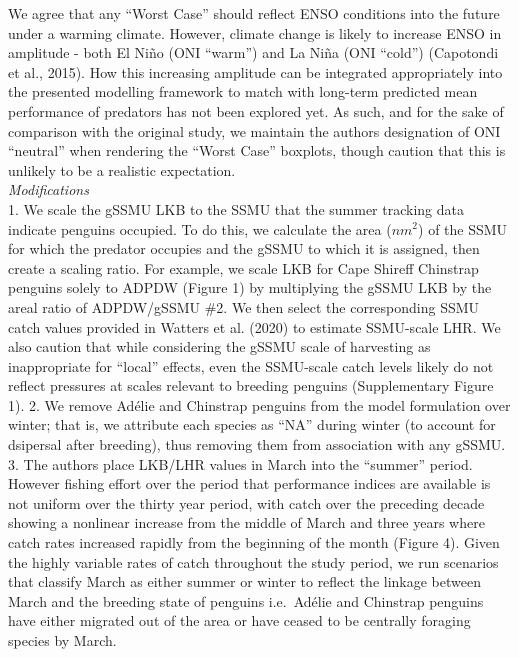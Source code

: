 \documentclass[]{elsarticle} %
\begin{document}
We agree that any ``Worst Case'' should reflect ENSO conditions into the
future under a warming climate. However, climate change is likely to
increase ENSO in amplitude - both El Niño (ONI ``warm'') and La Niña
(ONI ``cold'') (Capotondi et al., 2015). How this increasing amplitude
can be integrated appropriately into the presented modelling framework
to match with long-term predicted mean performance of predators has not
been explored yet. As such, and for the sake of comparison with the
original study, we maintain the authors designation of ONI ``neutral''
when rendering the ``Worst Case'' boxplots, though caution that this is
unlikely to be a realistic expectation.\\
\newline \emph{Modifications}\\
1. We scale the gSSMU LKB to the SSMU that the summer tracking data
indicate penguins occupied. To do this, we calculate the area (\(nm^2\))
of the SSMU for which the predator occupies and the gSSMU to which it is
assigned, then create a scaling ratio. For example, we scale LKB for
Cape Shireff Chinstrap penguins solely to ADPDW (Figure 1) by
multiplying the gSSMU LKB by the areal ratio of ADPDW/gSSMU \#2. We then
select the corresponding SSMU catch values provided in Watters et al.
(2020) to estimate SSMU-scale LHR. We also caution that while
considering the gSSMU scale of harvesting as inappropriate for ``local''
effects, even the SSMU-scale catch levels likely do not reflect
pressures at scales relevant to breeding penguins (Supplementary Figure
1). 2. We remove Adélie and Chinstrap penguins from the model
formulation over winter; that is, we attribute each species as ``NA''
during winter (to account for dsipersal after breeding), thus removing
them from association with any gSSMU.\\
3. The authors place LKB/LHR values in March into the ``summer'' period.
However fishing effort over the period that performance indices are
available is not uniform over the thirty year period, with catch over
the preceding decade showing a nonlinear increase from the middle of
March and three years where catch rates increased rapidly from the
beginning of the month (Figure 4). Given the highly variable rates of
catch throughout the study period, we run scenarios that classify March
as either summer or winter to reflect the linkage between March and the
breeding state of penguins i.e.~Adélie and Chinstrap penguins have
either migrated out of the area or have ceased to be centrally foraging
species by March.
\end{document}
